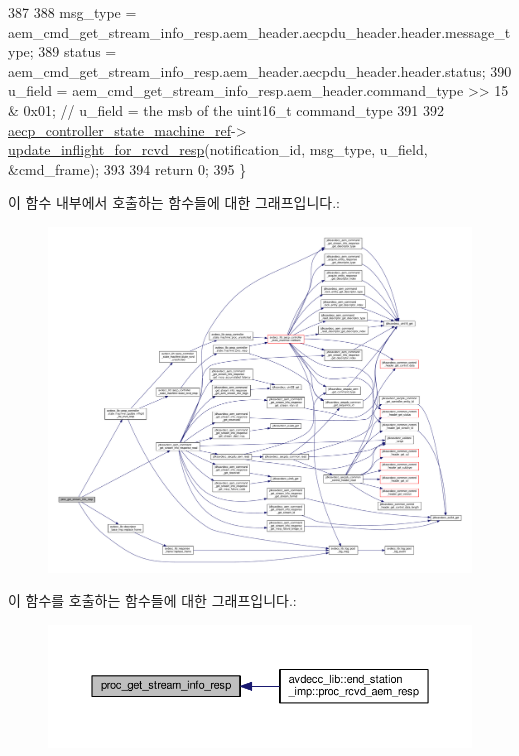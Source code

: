 \begin{DoxyCode}
387 
388     msg\_type = aem\_cmd\_get\_stream\_info\_resp.aem\_header.aecpdu\_header.header.message\_type;
389     status = aem\_cmd\_get\_stream\_info\_resp.aem\_header.aecpdu\_header.header.status;
390     u\_field = aem\_cmd\_get\_stream\_info\_resp.aem\_header.command\_type >> 15 & 0x01; \textcolor{comment}{// u\_field = the msb of
       the uint16\_t command\_type}
391 
392     \hyperlink{namespaceavdecc__lib_a0b1b5aea3c0490f77cbfd9178af5be22}{aecp\_controller\_state\_machine\_ref}->
      \hyperlink{classavdecc__lib_1_1aecp__controller__state__machine_a997abd9786c330a5505e903e6443208e}{update\_inflight\_for\_rcvd\_resp}(notification\_id, msg\_type, u\_field, &cmd\_frame);
393 
394     \textcolor{keywordflow}{return} 0;
395 \}
\end{DoxyCode}


이 함수 내부에서 호출하는 함수들에 대한 그래프입니다.\+:
\nopagebreak
\begin{figure}[H]
\begin{center}
\leavevmode
\includegraphics[width=350pt]{classavdecc__lib_1_1stream__output__descriptor__imp_a7295ef0aaf778e1d94aa5b8150104a3e_cgraph}
\end{center}
\end{figure}




이 함수를 호출하는 함수들에 대한 그래프입니다.\+:
\nopagebreak
\begin{figure}[H]
\begin{center}
\leavevmode
\includegraphics[width=350pt]{classavdecc__lib_1_1stream__output__descriptor__imp_a7295ef0aaf778e1d94aa5b8150104a3e_icgraph}
\end{center}
\end{figure}


